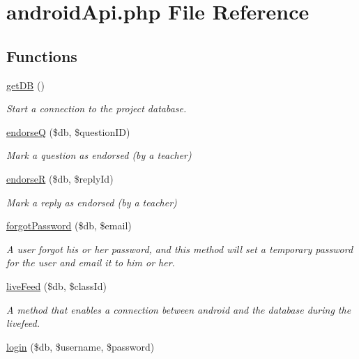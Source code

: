 \hypertarget{androidApi_8php}{}\section{android\+Api.\+php File Reference}
\label{androidApi_8php}
\subsection*{Functions}
\begin{DoxyCompactItemize}
\item 
\mbox{\hyperlink{androidApi_8php_a4162847310de81b83504109485866a7c}{get\+DB}} ()
\begin{DoxyCompactList}\small\item\em Start a connection to the project database. \end{DoxyCompactList}\item 
\mbox{\hyperlink{androidApi_8php_ad22fece50586ea491653f475dd202725}{endorseQ}} (\$db, \$question\+ID)
\begin{DoxyCompactList}\small\item\em Mark a question as endorsed (by a teacher) \end{DoxyCompactList}\item 
\mbox{\hyperlink{androidApi_8php_a2a034b0443357e70cc4c590ccf0956bd}{endorseR}} (\$db, \$reply\+Id)
\begin{DoxyCompactList}\small\item\em Mark a reply as endorsed (by a teacher) \end{DoxyCompactList}\item 
\mbox{\hyperlink{androidApi_8php_aac2880d8e0c5114faff40f5f80acb15d}{forgot\+Password}} (\$db, \$email)
\begin{DoxyCompactList}\small\item\em A user forgot his or her password, and this method will set a temporary password for the user and email it to him or her. \end{DoxyCompactList}\item 
\mbox{\hyperlink{androidApi_8php_a62900745b211b6c128ff5d2019613cbf}{live\+Feed}} (\$db, \$class\+Id)
\begin{DoxyCompactList}\small\item\em A method that enables a connection between android and the database during the livefeed. \end{DoxyCompactList}\item 
\mbox{\hyperlink{androidApi_8php_ad85fd260db342445f57bf80254aac576}{login}} (\$db, \$username, \$password)

\end{DoxyCompactItemize}
